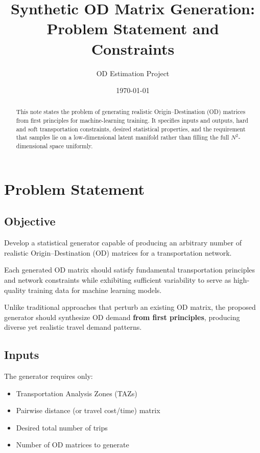 \documentclass[11pt,a4paper]{article}
\title{Synthetic OD Matrix Generation:\\Problem Statement and Constraints}
\author{OD Estimation Project}
\date{\today}
\begin{document}
\maketitle

\begin{abstract}
This note states the problem of generating realistic Origin--Destination (OD) matrices from first principles for machine-learning training. It specifies inputs and outputs, hard and soft transportation constraints, desired statistical properties, and the requirement that samples lie on a low-dimensional latent manifold rather than filling the full $N^2$-dimensional space uniformly.
\end{abstract}

\section{Problem Statement}

\subsection{Objective}

Develop a statistical generator capable of producing an arbitrary number of realistic Origin--Destination (OD) matrices for a transportation network.

Each generated OD matrix should satisfy fundamental transportation principles and network constraints while exhibiting sufficient variability to serve as high-quality training data for machine learning models.

Unlike traditional approaches that perturb an existing OD matrix, the proposed generator should synthesize OD demand \textbf{from first principles}, producing diverse yet realistic travel demand patterns.

\subsection{Inputs}

The generator requires only:

\begin{itemize}
    \item Transportation Analysis Zones (TAZs)
    \item Pairwise distance (or travel cost/time) matrix
    \item Desired total number of trips
    \item Number of OD matrices to generate
\end{itemize}
\end{document}
